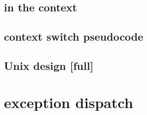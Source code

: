 \subsection{in the context}


\subsection{context switch pseudocode}


\subsection{Unix design [full]}


\section{exception dispatch}


